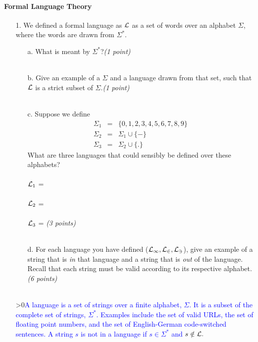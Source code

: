 \documentclass[12pt]{article}
\newcounter{showsolution}
\newcommand{\solution}[2]{\ifnum\value{showsolution}>0{\textcolor{blue}{#1}}\else{#2}\fi}
\begin{document}
\paragraph{Formal Language Theory}
\begin{itemize}

\item[1.] We defined a formal language as $\cal{L}$ as a set of words over an alphabet $\Sigma$, where the words are drawn from $\Sigma^*$.
\begin{itemize}
    \item[a.] What is meant by $\Sigma^*$?\hfill{\em (1 point)}\\\\

    \item[b.] Give an example of a $\Sigma$ and a language drawn from that set, such that $\cal{L}$ is a strict subset of $\Sigma$.\hfill{\em (1 point)}\\\\
    \item[c.] Suppose we define
    \begin{eqnarray*}
    \Sigma_1 &=&\{0, 1, 2, 3, 4, 5, 6, 7, 8, 9\} \\
    \Sigma_2 &=&\Sigma_1 \cup \{-\} \\
    \Sigma_3 &=&\Sigma_2 \cup \{.\}
    \end{eqnarray*}
    What are three languages that could sensibly be defined over these alphabets?\\\\
    ${\cal{L}}_1$ = \\\\ 
    ${\cal{L}}_2$ = \\\\
    ${\cal{L}}_3$ = \hfill{\em (3 points)}\\\\
    \item[d.] For each language you have defined (${\cal{L_1, L_2, L_3}}$), give an example of a string that is \emph{in} that language and a string that is \emph{out} of the language. Recall that each string must be valid according to its respective alphabet.\hfill{\em (6 points)}\\\\
\end{itemize}

\solution{A language is a set of strings over a finite alphabet, $\Sigma$. 
It is a subset of the complete set of strings, $\Sigma^*$.
Examples include the set of valid URLs, the set of floating point numbers, and the set of English-German code-switched sentences.
A string $s$ is not in a language if $s\in\Sigma^*$ and $s\notin{\cal{L}}.$ \vspace{2cm}}
{\vspace{55mm}}




\end{itemize}
\end{document}
